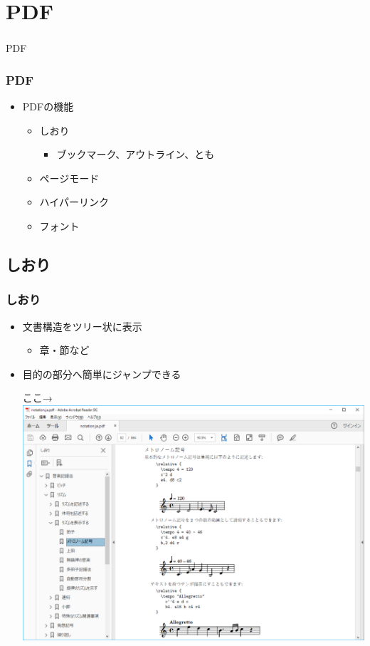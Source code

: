 \documentclass[unicode,17pt]{beamer}
\begin{document}
\section{PDF}
\begin{frame}\frametitle{}
  \centering
  PDF
\end{frame}

\begin{frame}\frametitle{PDF}
  \begin{itemize}
  \item PDFの機能
    \begin{itemize}
    \item しおり
      \begin{itemize}
      \item ブックマーク、アウトライン、とも
      \end{itemize}
    \item ページモード
    \item ハイパーリンク
    \item フォント
    \end{itemize}
  \end{itemize}
\end{frame}

\subsection{しおり}
\begin{frame}\frametitle{しおり}
  \begin{itemize}
  \item 文書構造をツリー状に表示
    \begin{itemize}
    \item 章・節など
    \end{itemize}
  \item 目的の部分へ簡単にジャンプできる
    \begin{center}
      ここ→\includegraphics[width=0.7\linewidth]{notation-ja-capture.png}
    \end{center}
  \end{itemize}
\end{frame}
\end{document}
